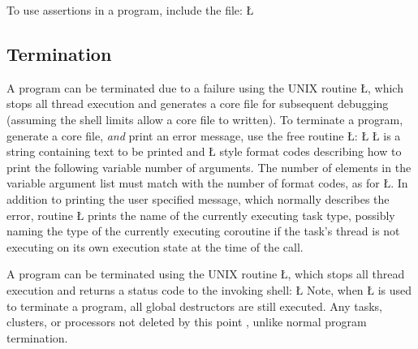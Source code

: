 \documentclass[openright,twoside]{report}
\begin{document}
To use assertions in a \uC program, include the file:
\LGinlinefalse\LGbegin\lgrinde
\L{}
\endlgrinde\LGend
{}%


\subsection{Termination}
\label{s:Termination}

A \uC program can be terminated due to a failure using the UNIX routine \LGinlinetrue\LGbegin\lgrinde\L{}\endlgrinde\LGend{}, which stops all thread execution and generates a core file for subsequent debugging (assuming the shell limits allow a core file to written).
To terminate a program, generate a core file, \emph{and} print an error message, use the \uC free routine \LGinlinetrue\LGbegin\lgrinde\L{}\endlgrinde\LGend{}:
\LGinlinefalse\LGbegin\lgrinde
\L{}
\endlgrinde\LGend
{}%
\LGinlinetrue\LGbegin\lgrinde\L{}\endlgrinde\LGend{} is a string containing text to be printed and \LGinlinetrue\LGbegin\lgrinde\L{}\endlgrinde\LGend{} style format codes describing how to print the following variable number of arguments.
The number of elements in the variable argument list must match with the number of format codes, as for \LGinlinetrue\LGbegin\lgrinde\L{}\endlgrinde\LGend{}.
In addition to printing the user specified message, which normally describes the error, routine \LGinlinetrue\LGbegin\lgrinde\L{}\endlgrinde\LGend{} prints the name of the currently executing task type, possibly naming the type of the currently executing coroutine if the task's thread is not executing on its own execution state at the time of the call.

A \uC program can be terminated using the UNIX routine \LGinlinetrue\LGbegin\lgrinde\L{}\endlgrinde\LGend{}, which stops all thread execution and returns a status code to the invoking shell:
\LGinlinefalse\LGbegin\lgrinde
\L{}
\endlgrinde\LGend
Note, when \LGinlinetrue\LGbegin\lgrinde\L{}\endlgrinde\LGend{} is used to terminate a program, all global destructors are still executed.
Any tasks, clusters, or processors not deleted by this point , unlike normal program termination.
\end{document}
